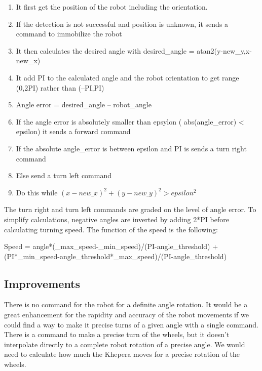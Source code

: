     \begin{enumerate}
        \item It first get the position of the robot including 
            the orientation. 
        \item If the detection is not successful and position is unknown, 
            it sends a command to immobilize the robot
        \item It then calculates the desired angle with desired\_angle = 
            atan2(y-new\_y,x-new\_x)
        \item It add PI to the calculated angle and the robot orientation 
            to get range (0,2PI) rather than (–PI,PI)
        \item Angle error = desired\_angle – robot\_angle
        \item If the angle error is absolutely smaller than epsylon 
            ( abs(angle\_error) < epsilon) it sends a forward command
        \item If the absolute angle\_error is between epsilon and PI is 
            sends a turn right command
        \item Else send a turn left command
        \item Do this while $(x-new\_x)^2+(y-new\_y)^2 > epsilon^2$ 
    \end{enumerate}


The turn right and turn left commands are graded on the level of angle 
error. To simplify calculations, negative angles are inverted by adding 
2*PI before calculating turning speed. The function of the speed is 
the following:

Speed = angle*(\_max\_speed-\_min\_speed)/(PI-angle\_threshold) + 
(PI*\_min\_speed-angle\_threshold*\_max\_speed)/(PI-angle\_threshold)

\subsection{Improvements}

There is no command for the robot for a definite angle rotation. It 
would be a great enhancement for the rapidity and accuracy of the robot 
movements if we could find a way to make it precise turns of a given 
angle with a single command. There is a command to make a precise turn 
of the wheels, but it doesn’t interpolate directly to a complete robot 
rotation of a precise angle. We would need to calculate how much the 
Khepera moves for a precise rotation of the wheels.

